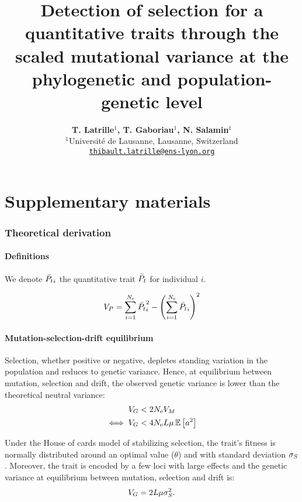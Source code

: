 \documentclass{article}
\title{Detection of selection for a quantitative traits through the scaled mutational variance at the phylogenetic and population-genetic level}
\author{
    \large
    \textbf{T. {Latrille}$^{1}$, T. {Gaboriau}$^{1}$, N. {Salamin}$^{1}$}\\
    \normalsize
    $^{1}$Université de Lausanne, Lausanne, Switzerland\\
    \texttt{\href{mailto:thibault.latrille@ens-lyon.org}{thibault.latrille@ens-lyon.org}} \\
}
\date{}
\begin{document}
    \maketitle
    \part*{Supplementary materials}
    \tableofcontents
    \clearpage

    \section{Theoretical derivation}
    \subsection{Definitions}

    We denote $\bar{P_{t}}_{i}$ the quantitative trait $\bar{P_{t}}$ for individual $i$.

    \begin{align}
        V_{P} = \sum_{i=1}^{N_{\text{e}}} \bar{P_{t}}_{i}^2 - \left( \sum_{i=1}^{N_{\text{e}}} \bar{P_{t}}_{i} \right)^2
    \end{align}

    \subsection{Mutation-selection-drift equilibrium}

    Selection, whether positive or negative, depletes standing variation in the population and reduces to genetic variance.
    Hence, at equilibrium between mutation, selection and drift, the observed genetic variance is lower than the theoretical neutral variance:
    \begin{align}
        V_{G} & < 2 N_{\text{e}} V_{M} \\
        \iff V_{G} & < 4 N_{\text{e}} L \mu \operatorname{\mathbb{E}} \left[ a^2 \right]
    \end{align}

    Under the House of cards model of stabilizing selection\cite{kingman_simple_1978}, the trait's fitness is normally distributed around an optimal value ($\theta$) and with standard deviation $\sigma_S$.
    Moreover, the trait is encoded by a few loci with large effects and the genetic variance at equilibrium between mutation, selection and drift is:
    \begin{gather}
        V_{G} = 2 L \mu \sigma^2_S \label{eq-mutsel-HC}.
    \end{gather}
\end{document}
